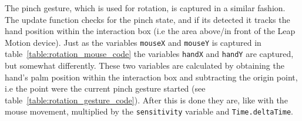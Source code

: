 The pinch gesture, which is used for rotation, is captured in a similar fashion. The update function checks for the pinch state, and if its detected
it tracks the hand position within the interaction box (i.e the area above/in front of the Leap Motion device). 
Just as the variables \texttt{mouseX} and \texttt{mouseY} is captured in table~\vref{table:rotation_mouse_code} the variables 
\texttt{handX} and \texttt{handY} are captured, but somewhat differently. These two variables are calculated by obtaining the hand's palm position within the interaction box
and subtracting the origin point, i.e the point were the current pinch gesture started (see table~\vref{table:rotation_gesture_code}). 
After this is done they are, like with the mouse movement, multiplied by the \texttt{sensitivity} variable and \texttt{Time.deltaTime}. 


